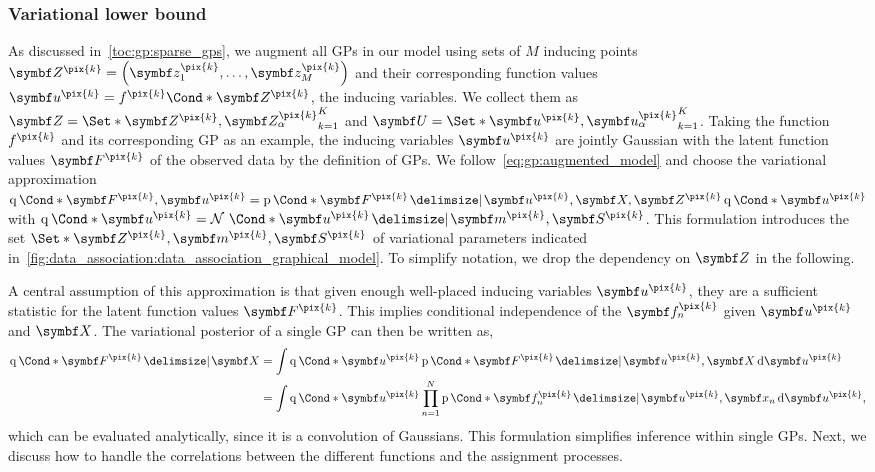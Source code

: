 \subsubsection{Variational lower bound}
As discussed in~\cref{toc:gp:sparse_gps}, we augment all GPs in our model using sets of $M$ inducing points $\mat{Z}^{\pix{k}} = \left(\mat{z}_1^{\pix{k}}, \ldots, \mat{z}_M^{\pix{k}}\right)$ and their corresponding function values $\mat{u}^{\pix{k}} = \Fun*{f^{\pix{k}}}{\mat{Z}^{\pix{k}}}$, the inducing variables.
We collect them as $\mat{Z} = \Set*{\mat{Z}^{\pix{k}}, \mat{Z}_\alpha^{\pix{k}}}_{k=1}^K$ and $\mat{U} = \Set*{\mat{u}^{\pix{k}}, \mat{u}_\alpha^{\pix{k}}}_{k=1}^K$.
Taking the function $f^{\pix{k}}$ and its corresponding GP as an example, the inducing variables $\mat{u}^{\pix{k}}$ are jointly Gaussian with the latent function values $\mat{F}^{\pix{k}}$ of the observed data by the definition of GPs.
We follow~\cref{eq:gp:augmented_model} and choose the variational approximation $\Variat*{\mat{F}^{\pix{k}}, \mat{u}^{\pix{k}}} = \Prob*{\mat{F}^{\pix{k}} \given \mat{u}^{\pix{k}}, \mat{X}, \mat{Z}^{\pix{k}}}\Variat*{\mat{u}^{\pix{k}}}$ with $\Variat*{\mat{u}^{\pix{k}}} = \Gaussian*{\mat{u}^{\pix{k}} \given \mat{m}^{\pix{k}}, \mat{S}^{\pix{k}}}$.
This formulation introduces the set $\Set*{\mat{Z}^{\pix{k}}, \mat{m}^{\pix{k}}, \mat{S}^{\pix{k}}}$ of variational parameters indicated in~\cref{fig:data_association:data_association_graphical_model}.
To simplify notation, we drop the dependency on $\mat{Z}$ in the following.

A central assumption of this approximation is that given enough well-placed inducing variables $\mat{u}^{\pix{k}}$, they are a sufficient statistic for the latent function values $\mat{F}^{\pix{k}}$.
This implies conditional independence of the $\mat{f}_n^{\pix{k}}$ given $\mat{u}^{\pix{k}}$ and $\mat{X}$.
The variational posterior of a single GP can then be written as,
\begin{equation}
    \begin{split}
        \Variat*{\mat{F}^{\pix{k}} \given \mat{X}}
        &=
        \int \Variat*{\mat{u}^{\pix{k}}}
        \Prob*{\mat{F}^{\pix{k}} \given \mat{u}^{\pix{k}}, \mat{X}}
        \diff \mat{u}^{\pix{k}}
        \\
        &=
        \int \Variat*{\mat{u}^{\pix{k}}}
        \prod_{n=1}^N \Prob*{\mat{f}_n^{\pix{k}} \given \mat{u}^{\pix{k}}, \mat{x}_n}
        \diff \mat{u}^{\pix{k}},
    \end{split}
\end{equation}
which can be evaluated analytically, since it is a convolution of Gaussians.
This formulation simplifies inference within single GPs.
Next, we discuss how to handle the correlations between the different functions and the assignment processes.

